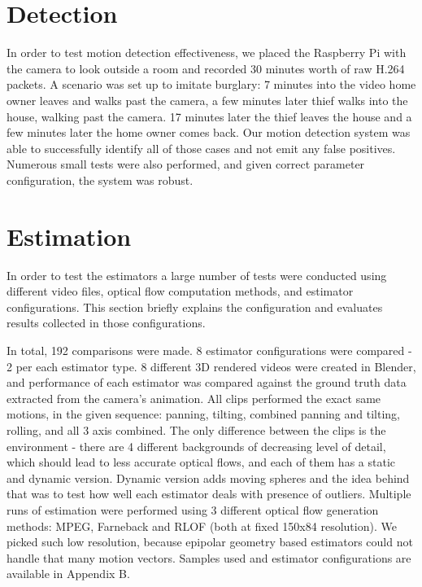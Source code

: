 \documentclass[11pt,english]{report}
\begin{document}
\section{Detection}

In order to test motion detection effectiveness, we placed the Raspberry Pi with the camera to look outside a room and recorded 30 minutes worth of raw H.264 packets. A scenario was set up to imitate burglary: 7 minutes into the video home owner leaves and walks past the camera, a few minutes later thief walks into the house, walking past the camera. 17 minutes later the thief leaves the house and a few minutes later the home owner comes back. Our motion detection system was able to successfully identify all of those cases and not emit any false positives. Numerous small tests were also performed, and given correct parameter configuration, the system was robust.

\section{Estimation}

In order to test the estimators a large number of tests were conducted using different video files, optical flow computation methods, and estimator configurations. This section briefly explains the configuration and evaluates results collected in those configurations.

In total, 192 comparisons were made. 8 estimator configurations were compared - 2 per each estimator type. 8 different 3D rendered videos were created in Blender, and performance of each estimator was compared against the ground truth data extracted from the camera's animation. All clips performed the exact same motions, in the given sequence: panning, tilting, combined panning and tilting, rolling, and all 3 axis combined. The only difference between the clips is the environment - there are 4 different backgrounds of decreasing level of detail, which should lead to less accurate optical flows, and each of them has a static and dynamic version. Dynamic version adds moving spheres and the idea behind that was to test how well each estimator deals with presence of outliers. Multiple runs of estimation were performed using 3 different optical flow generation methods: MPEG, Farneback and RLOF (both at fixed 150x84 resolution). We picked such low resolution, because epipolar geometry based estimators could not handle that many motion vectors. Samples used and estimator configurations are available in Appendix B.
\end{document}
